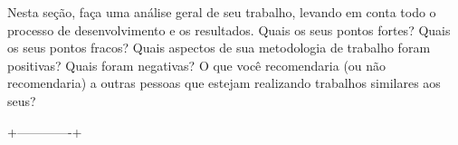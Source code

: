 \documentclass[twoside,conference,a4paper]{IEEEtran}
\begin{document}
Nesta seção, faça uma análise geral de seu trabalho, levando em conta todo o processo de desenvolvimento e os resultados. Quais os seus pontos fortes? Quais os seus pontos fracos? Quais aspectos de sua metodologia de trabalho foram positivas? Quais foram negativas? O que você recomendaria (ou não recomendaria) a outras pessoas que estejam realizando trabalhos similares aos seus? 


 +-------------+






\end{document}
